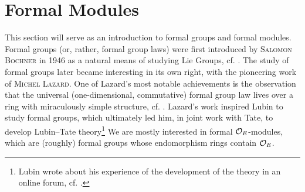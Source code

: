 \documentclass[../main.tex]{subfiles}
\begin{document}
\section{Formal Modules}
\label{sec:FormalModules}
This section will serve as an introduction to formal groups and 
formal modules. Formal groups (or, rather, formal group laws) were first
introduced by \textsc{Salomon Bochner} in 1946 as a natural means of studying Lie
Groups, cf. \cite{Bochner1946FGrps}. The study of formal groups later became
interesting in its own right, with the pioneering work of \textsc{Michel Lazard}. 
One of Lazard's most notable achievements is the observation that the universal
(one-dimensional, commutative) formal group law lives over a ring with
miraculously simple structure, cf. \cite{Lazard1955FGrps}. 
Lazard's work inspired Lubin to study formal groups, which ultimately led
him, in joint work with Tate, to develop Lubin--Tate theory\footnote{Lubin wrote
about his experience of the development of the theory in an online forum, cf.
\cite{mathoverflowLUBIN}.}
We are mostly interested in formal $\mathcal{O}_E$-modules, which are (roughly) formal groups
whose endomorphism rings contain $\mathcal{O}_E$.
\end{document}
